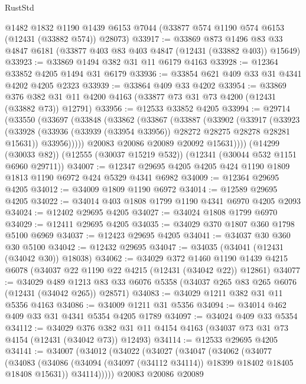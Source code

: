 \begin{lexlean}{RustStd}
\begin{coremodule}
    @1482
    @1832
    @1190
    @1439
    @6153
    @7044
    (@33877 @574 @1190 @574 @6153 (@12431 (@33882 @574)) @28073)
@33917 := @33869
    @873
    @1496
    @83
    @33
    @4847
    @6181
    (@33877 @403 @83 @403 @4847 (@12431 (@33882 @403)) @15649)
@33923 := @33869 @1494 @382 @31 @11 @6179 @4163
@33928 := @12364 @33852 @4205 @1494 @31 @6179
@33936 := @33854 @621 @409 @33 @31 @4341 @4202 @4205 @2323
@33939 := @33864 @409 @33 @4202
@33954 := @33869
    @376
    @382
    @31
    @11
    @4200
    @4163
    (@33877 @73 @31 @73 @4200 (@12431 (@33882 @73)) @12791)
@33956 := @12533 @33852 @4205
@33994 := @29714
    (@33550
      (@33697
        (@33848
          (@33862
            (@33867
              (@33887
                (@33902
                  (@33917
                    (@33923
                      (@33928 (@33936 (@33939 (@33954 @33956)) @28272 @28275 @28278 @28281 @15631))
                      @33956)))))
            @20083
            @20086
            @20089
            @20092
            @15631))))
    (@14299 (@30033 @82))
    (@12555 (@30037 @15219 @532))
    (@12341 (@30044 @532 @1151 @6960 @29711))
@34007 := @12347 @29695 @4205 @4205 @424 @1190 @1809 @1813 @1190 @6972 @424 @5329 @4341 @6982
@34009 := @12364 @29695 @4205
@34012 := @34009 @1809 @1190 @6972
@34014 := @12589 @29695 @4205
@34022 := @34014 @403 @1808 @1799 @1190 @4341 @6970 @4205 @2093
@34024 := @12402 @29695 @4205
@34027 := @34024 @1808 @1799 @6970
@34029 := @12411 @29695 @4205
@34035 := @34029 @370 @1807 @360 @1798 @5100 @6969
@34037 := @12423 @29695 @4205
@34041 := @34037 @30 @360 @30 @5100
@34042 := @12432 @29695
@34047 := @34035 (@34041 (@12431 (@34042 @30)) @18038)
@34062 := @34029
    @372
    @1460
    @1190
    @1439
    @4215
    @6078
    (@34037 @22 @1190 @22 @4215 (@12431 (@34042 @22)) @12861)
@34077 := @34029
    @489
    @1213
    @83
    @33
    @6076
    @5358
    (@34037 @265 @83 @265 @6076 (@12431 (@34042 @265)) @28571)
@34083 := @34029 @1211 @382 @31 @11 @5356 @4163
@34086 := @34009 @1211 @31 @5356
@34094 := @34014 @462 @409 @33 @31 @4341 @5354 @4205 @1789
@34097 := @34024 @409 @33 @5354
@34112 := @34029
    @376
    @382
    @31
    @11
    @4154
    @4163
    (@34037 @73 @31 @73 @4154 (@12431 (@34042 @73)) @12493)
@34114 := @12533 @29695 @4205
@34141 := @34007
    (@34012
      (@34022
        (@34027
          (@34047
            (@34062
              (@34077
                (@34083
                  (@34086 (@34094 (@34097 (@34112 @34114)) @18399 @18402 @18405 @18408 @15631))
                  @34114)))))
        @20083
        @20086
        @20089

\end{coremodule}
\end{lexlean}
